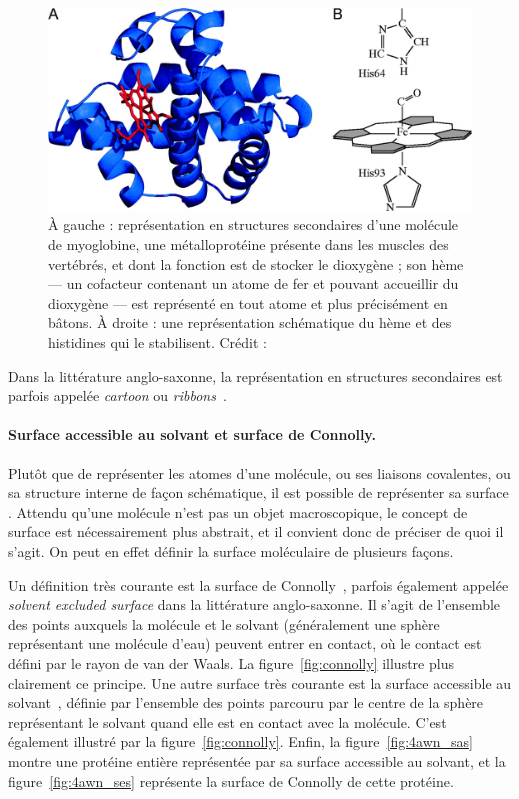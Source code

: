 	\begin{figure}[H]
		\centering
		\includegraphics[width=\textwidth]{figures/ch1/myoglobin}
		\caption{À gauche : représentation en structures secondaires d'une molécule de myoglobine, une métalloprotéine présente dans les muscles des vertébrés, et dont la fonction est de stocker le dioxygène ; son hème --- un cofacteur contenant un atome de fer et pouvant accueillir du dioxygène --- est représenté en \og tout atome \fg{} et plus précisément en bâtons. À droite : une représentation schématique du hème et des histidines qui le stabilisent. Crédit :~\cite{Ordway3441}}
		\label{fig:myoglobin}
	\end{figure}
	
	Dans la littérature anglo-saxonne, la représentation en structures secondaires est parfois appelée \emph{cartoon} ou \emph{ribbons}~\cite{carson1986algorithm, richardson2000early}.
		
		
	\paragraph{Surface accessible au solvant et surface de Connolly.} Plutôt que de représenter les atomes d'une molécule, ou ses liaisons covalentes, ou sa structure interne de façon schématique, il est possible de représenter sa \og surface \fg{}. Attendu qu'une molécule n'est pas un objet macroscopique, le concept de surface est nécessairement plus abstrait, et il convient donc de préciser de quoi il s'agit. On peut en effet définir la surface moléculaire de plusieurs façons.
		
	Un définition très courante est la surface de Connolly~\cite{connolly1983analytical}, parfois également appelée \emph{solvent excluded surface} dans la littérature anglo-saxonne. Il s'agit de l'ensemble des points auxquels la molécule et \og le solvant \fg{} (généralement une sphère représentant une molécule d'eau) peuvent entrer en contact, où le contact est défini par le rayon de van der Waals. La figure~\ref{fig:connolly} illustre plus clairement ce principe. Une autre surface très courante est la surface accessible au solvant~\cite{lee1971interpretation}, définie par l'ensemble des points parcouru par le centre de la sphère représentant le solvant quand elle est en contact avec la molécule. C'est également illustré par la figure~\ref{fig:connolly}. Enfin, la figure~\ref{fig:4awn_sas} montre une protéine entière représentée par sa surface accessible au solvant, et la figure~\ref{fig:4awn_ses} représente la surface de Connolly de cette protéine.
		
